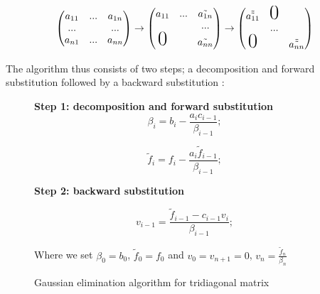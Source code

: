 \documentclass[11pt]{article}
\begin{document}
$$
\begin{pmatrix}
a_{11} &  ... & a_{1n}\\
... & &... \\
a_{n1} & ... & a_{nn}\\
\end{pmatrix}
\rightarrow
\begin{pmatrix}
a_{11} &...& \tilde{a_{1n}}\\
&& ... \\
\text{\huge0} & & \tilde{a_{nn}}\\
\end{pmatrix}
\rightarrow
\begin{pmatrix}
\tilde{\tilde{a_{11}}} & \text{\huge0}\\
&...\\
\text{\huge0} & & \tilde{\tilde{a_{nn}}}\\
\end{pmatrix}
$$

\begin{flushleft}

The algorithm thus consists of two steps; a decomposition and forward substitution followed by a backward substitution \cite{hjorth2011computational}:

\begin{figure}[ht]\label{Gaussian algorithm}
\begin{framed}
\begin{minipage}[b]{0.45\linewidth}
\centering
\textbf{Step 1: decomposition and forward substitution}
\begin{equation}\label{Gaussian step 1-1}
\beta_i = b_i - \frac{a_i c_{i - 1}}{\beta_{i-1}};
\end{equation}

\begin{equation}\label{Gaussian step 1-2}
\tilde{f}_i = f_i - \frac{a_i \tilde{f}_{i-1}}{\beta_{i-1}};
\end{equation}
\end{minipage}
\hspace{0.5cm}
\begin{minipage}[b]{0.45\linewidth}
\centering
\textbf{Step 2: backward substitution}
 
\begin{equation}\label{Gaussian step 2}
v_{i-1} = \frac{\tilde{f}_{i-1} - c_{i-1} v_i}{\beta_{i-1}};
\end{equation}

Where we set $\beta_0 = b_0$, $\tilde{f}_0 = f_0$ and $v_0 = v_{n+1} = 0$, $v_n = \frac{\tilde{f}_n}{\beta_n}$
\end{minipage}
\end{framed}
\caption{Gaussian elimination algorithm for tridiagonal matrix}
\end{figure}

\end{flushleft}
\end{document}
